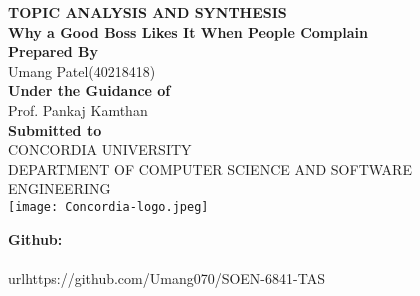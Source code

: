\documentclass[a4paper,12pt]{report}
\begin{document}
\begin{titlepage}
   \begin{center}
       \vspace*{-8ex}
        \begin{figure}[h!]
  \centering
\end{figure}

       \textbf{\large TOPIC ANALYSIS AND SYNTHESIS }\\[0.3in]
        \textbf{\large Why a Good Boss Likes It When People Complain} \\ [0.3in]
        \textbf{\large Prepared By} \\[0.1in]
        \normal Umang Patel(40218418)\\[0.3in]
       

        \textbf{\large Under the Guidance of}\\[0.15in]
        \normal Prof. Pankaj Kamthan\\[0.4in]

        \textbf{\large Submitted to}\\[0.15in]
        \normal CONCORDIA UNIVERSITY\\[0.05in]
        \normal DEPARTMENT OF COMPUTER SCIENCE AND SOFTWARE ENGINEERING\\[0.2in]
        \texttt{[image: Concordia-logo.jpeg]}

       \vspace{1.0cm}
      
        \textbf{Github:}\\\\url{https://github.com/Umang070/SOEN-6841-TAS}\\[0.2in]
    
       \vfill
   \end{center}
\end{titlepage}

\renewcommand{\thesection}{\arabic{section}}
\tableofcontents

\newpage
\end{document}
